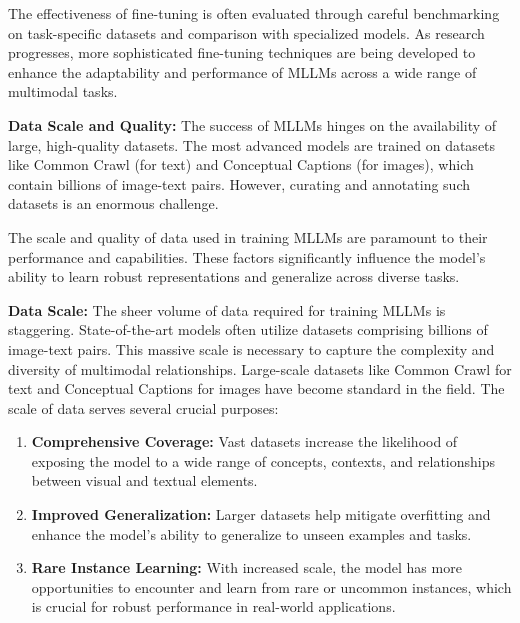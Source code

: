The effectiveness of fine-tuning is often evaluated through careful benchmarking on task-specific datasets and comparison with specialized models. As research progresses, more sophisticated fine-tuning techniques are being developed to enhance the adaptability and performance of MLLMs across a wide range of multimodal tasks.


\textbf{Data Scale and Quality:} The success of MLLMs hinges on the availability of large, high-quality datasets. The most advanced models are trained on datasets like Common Crawl (for text) and Conceptual Captions (for images), which contain billions of image-text pairs. However, curating and annotating such datasets is an enormous challenge.

The scale and quality of data used in training MLLMs are paramount to their performance and capabilities. These factors significantly influence the model's ability to learn robust representations and generalize across diverse tasks.

\textbf{Data Scale:} The sheer volume of data required for training MLLMs is staggering. State-of-the-art models often utilize datasets comprising billions of image-text pairs. This massive scale is necessary to capture the complexity and diversity of multimodal relationships. Large-scale datasets like Common Crawl for text and Conceptual Captions for images have become standard in the field. The scale of data serves several crucial purposes:
\begin{enumerate}
    \item \textbf{Comprehensive Coverage:} Vast datasets increase the likelihood of exposing the model to a wide range of concepts, contexts, and relationships between visual and textual elements.
    \item \textbf{Improved Generalization:} Larger datasets help mitigate overfitting and enhance the model's ability to generalize to unseen examples and tasks.
    \item \textbf{Rare Instance Learning:} With increased scale, the model has more opportunities to encounter and learn from rare or uncommon instances, which is crucial for robust performance in real-world applications.
\end{enumerate}

